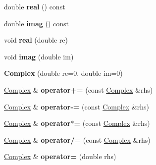 \begin{DoxyCompactItemize}
\item 
\mbox{\label{classComplex_a312e4b19146128408fb06e0150b0faf6}} 
double {\bfseries real} () const
\item 
\mbox{\label{classComplex_af8aacf982e2e6c142921bc850f6dc974}} 
double {\bfseries imag} () const
\item 
\mbox{\label{classComplex_aaa379be764626b09b66055ba1500567c}} 
void {\bfseries real} (double re)
\item 
\mbox{\label{classComplex_a72fdcc794ef364082c293e04d5373b30}} 
void {\bfseries imag} (double im)
\item 
\mbox{\label{classComplex_a26053ce38e21511f0147ac398d896edc}} 
{\bfseries Complex} (double re=0, double im=0)
\item 
\mbox{\label{classComplex_a956a3fc04d0049607bb67cf9cd3817d0}} 
\hyperlink{classComplex}{Complex} \& {\bfseries operator+=} (const \hyperlink{classComplex}{Complex} \&rhs)
\item 
\mbox{\label{classComplex_ae9f59191ac370070463e4669df631185}} 
\hyperlink{classComplex}{Complex} \& {\bfseries operator-\/=} (const \hyperlink{classComplex}{Complex} \&rhs)
\item 
\mbox{\label{classComplex_aa4d2d37f0613b14e7b74c5afb49617d9}} 
\hyperlink{classComplex}{Complex} \& {\bfseries operator$\ast$=} (const \hyperlink{classComplex}{Complex} \&rhs)
\item 
\mbox{\label{classComplex_a6cdb101e53dbaae088c7d2e3c2099f06}} 
\hyperlink{classComplex}{Complex} \& {\bfseries operator/=} (const \hyperlink{classComplex}{Complex} \&rhs)
\item 
\mbox{\label{classComplex_a8011d6b4dae1439794acb899bd89e644}} 
\hyperlink{classComplex}{Complex} \& {\bfseries operator=} (double rhs)
\item 
\mbox{\label{classComplex_a01668fb06790072b5024f1ae30330265}} 

\end{DoxyCompactItemize}
